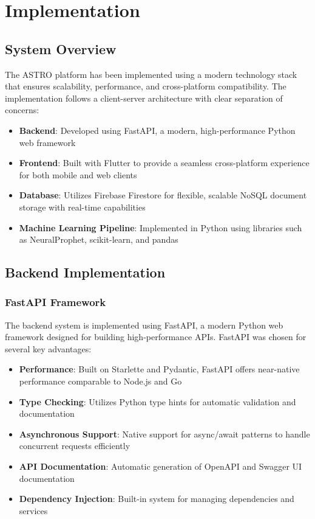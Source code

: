 \chapter{Implementation}

\section{System Overview}

The ASTRO platform has been implemented using a modern technology stack that ensures scalability, performance, and cross-platform compatibility. The implementation follows a client-server architecture with clear separation of concerns:

\begin{itemize}
    \item \textbf{Backend}: Developed using FastAPI, a modern, high-performance Python web framework
    \item \textbf{Frontend}: Built with Flutter to provide a seamless cross-platform experience for both mobile and web clients
    \item \textbf{Database}: Utilizes Firebase Firestore for flexible, scalable NoSQL document storage with real-time capabilities
    \item \textbf{Machine Learning Pipeline}: Implemented in Python using libraries such as NeuralProphet, scikit-learn, and pandas
\end{itemize}
\section{Backend Implementation}

\subsection{FastAPI Framework}

The backend system is implemented using FastAPI, a modern Python web framework designed for building high-performance APIs. FastAPI was chosen for several key advantages:

\begin{itemize}
    \item \textbf{Performance}: Built on Starlette and Pydantic, FastAPI offers near-native performance comparable to Node.js and Go
    \item \textbf{Type Checking}: Utilizes Python type hints for automatic validation and documentation
    \item \textbf{Asynchronous Support}: Native support for async/await patterns to handle concurrent requests efficiently
    \item \textbf{API Documentation}: Automatic generation of OpenAPI and Swagger UI documentation
    \item \textbf{Dependency Injection}: Built-in system for managing dependencies and services
\end{itemize}

